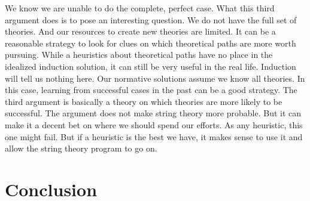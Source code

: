 \documentclass{article}
\begin{document}
	
	We know we are unable to do the complete, perfect case. What this third argument does is to pose an interesting question. We do not have the full set of theories. And our resources to create new theories are limited. It can be a reasonable strategy to look for clues on which theoretical paths are more worth pursuing. While a heuristics about theoretical paths have no place in the idealized induction solution, it can still be very useful in the real life. Induction will tell us nothing here. Our normative solutions assume we know all theories. In this case, learning from successful cases in the past can be a good strategy. The third argument is basically a theory on which theories are more likely to be successful. The argument does not make string theory more probable. But it can make it a decent bet on where we should spend our efforts. As any heuristic, this one might fail. But if a heuristic is the best we have, it makes sense to use it and allow the string theory program to go on.
	
	
	
	
	\section{Conclusion}
	
\end{document}

